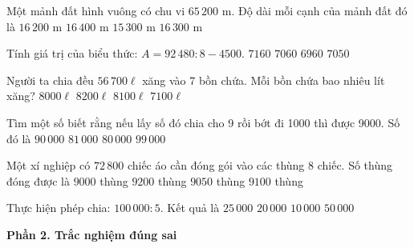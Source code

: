 \begin{ex} %
Một mảnh đất hình vuông có chu vi $65\,200\text{ m}$. Độ dài mỗi cạnh của mảnh đất đó là
\choice
{$16\,200\text{ m}$}
{$16\,400\text{ m}$}
{$15\,300\text{ m}$}
{\True $16\,300\text{ m}$}
\end{ex}

\begin{ex} %
Tính giá trị của biểu thức: $A = 92\,480 : 8 - 4500$.
\choice
{$7160$}
{\True $7060$}
{$6960$}
{$7050$}
\end{ex}

\begin{ex} %
Người ta chia đều $56\,700\ell$ xăng vào 7 bồn chứa. Mỗi bồn chứa bao nhiêu lít xăng?
\choice
{$8000\ell$}
{$8200\ell$}
{\True $8100\ell$}
{$7100\ell$}
\end{ex}

\begin{ex} %
Tìm một số biết rằng nếu lấy số đó chia cho 9 rồi bớt đi 1000 thì được 9000. Số đó là
\choice
{\True $90\,000$}
{$81\,000$}
{$80\,000$}
{$99\,000$}
\end{ex}

\begin{ex} %
Một xí nghiệp có $72\,800$ chiếc áo cần đóng gói vào các thùng 8 chiếc. Số thùng đóng được là
\choice
{$9000$ thùng}
{$9200$ thùng}
{$9050$ thùng}
{\True $9100$ thùng}
\end{ex}

\begin{ex} %
Thực hiện phép chia: $100\,000 : 5$. Kết quả là
\choice
{$25\,000$}
{\True $20\,000$}
{$10\,000$}
{$50\,000$}
\end{ex}

\textbf{Phần 2. Trắc nghiệm đúng sai}


